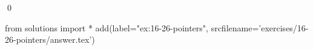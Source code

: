 
\begin{ex}
  \label{ex:16-26-pointers}
  
  \qed
\end{ex}
\begin{python0}
from solutions import *
add(label="ex:16-26-pointers",
    srcfilename='exercises/16-26-pointers/answer.tex')
\end{python0}
